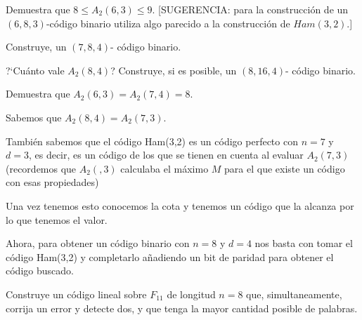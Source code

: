 \begin{problem}[8]
\ppart Demuestra que $8\le A_2(6,3)\le 9$. [SUGERENCIA: para la construcción
de un $(6,8,3)$-código binario utiliza algo parecido a la
construcción de $Ham(3,2)$.]

\ppart   Construye, un
$(7,8,4)$- código binario.

\ppart ?`Cuánto vale $A_2(8,4)$? Construye, si es posible, un
$(8,16,4)$- código binario.

\ppart Demuestra que $A_2(6,3)=A_2(7,4)=8$.
\solution

\spart

\spart

\spart

Sabemos que $A_2(8,4)=A_2(7,3)$.

También sabemos que el código Ham(3,2) es un código perfecto con $n=7$ y $d=3$, es decir, es un código de los que se tienen en cuenta al evaluar $A_2(7,3)$ (recordemos que $A_2(,3)$ calculaba el máximo $M$ para el que existe un código con esas propiedades)

Una vez tenemos esto conocemos la cota y tenemos un código que la alcanza por lo que tenemos el valor.

Ahora, para obtener un código binario con $n=8$ y $d=4$ nos basta con tomar el código Ham(3,2) y completarlo añadiendo un bit de paridad para obtener el código buscado.

\spart

\end{problem}

\begin{problem}[9]
Construye un código lineal sobre $ F_{11}$ de longitud $n=8$
que, simultaneamente, corrija un error y detecte dos, y que tenga
la mayor cantidad posible de palabras.
\solution
\end{problem}

